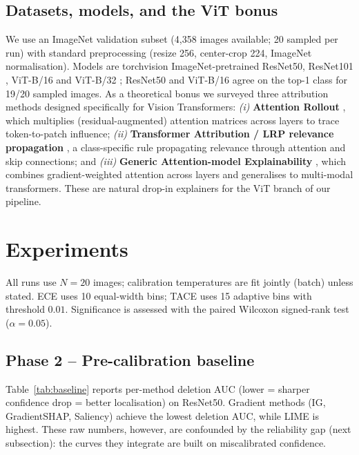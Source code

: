 \documentclass[11pt]{article}
\begin{document}
\subsection{Datasets, models, and the ViT bonus}
We use an ImageNet validation subset (4{,}358 images available; 20 sampled per
run) with standard preprocessing (resize 256, center-crop 224, ImageNet
normalisation). Models are torchvision ImageNet-pretrained ResNet50, ResNet101
\citep{he2016deep}, ViT-B/16 and ViT-B/32 \citep{dosovitskiy2021image}; ResNet50
and ViT-B/16 agree on the top-1 class for 19/20 sampled images. As a theoretical
bonus we surveyed three attribution methods designed specifically for Vision
Transformers: \emph{(i)} \textbf{Attention Rollout}
\citep{abnar2020quantifying}, which multiplies (residual-augmented) attention
matrices across layers to trace token-to-patch influence; \emph{(ii)}
\textbf{Transformer Attribution / LRP relevance propagation}
\citep{chefer2021transformer}, a class-specific rule propagating relevance
through attention and skip connections; and \emph{(iii)} \textbf{Generic
Attention-model Explainability} \citep{chefer2021generic}, which combines
gradient-weighted attention across layers and generalises to multi-modal
transformers. These are natural drop-in explainers for the ViT branch of our
pipeline.

\section{Experiments}

All runs use $N{=}20$ images; calibration temperatures are fit jointly (batch)
unless stated. ECE uses 10 equal-width bins; TACE uses 15 adaptive bins with
threshold $0.01$. Significance is assessed with the paired Wilcoxon signed-rank
test ($\alpha{=}0.05$).



\subsection{Phase 2 -- Pre-calibration baseline}
Table~\ref{tab:baseline} reports per-method deletion AUC (lower = sharper
confidence drop = better localisation) on ResNet50. Gradient methods (IG,
GradientSHAP, Saliency) achieve the lowest deletion AUC, while LIME is highest.
These raw numbers, however, are confounded by the reliability gap (next
subsection): the curves they integrate are built on miscalibrated confidence.
\end{document}
